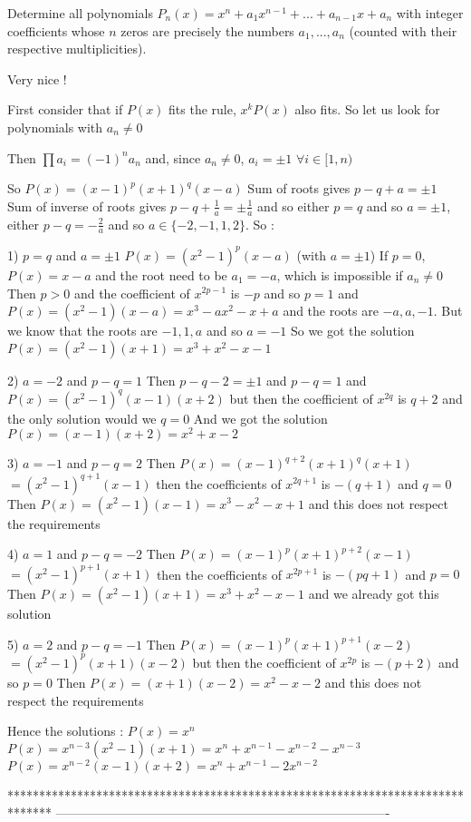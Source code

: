 \begin{solution}
	\begin{tcolorbox}Determine all polynomials $ P_n(x) = x^n + a_1 x^{n - 1} + ... + a_{n - 1} x + a_n$ with integer coefficients whose $ n$ zeros are precisely the numbers $ a_1,...,a_n$ (counted with their respective multiplicities).\end{tcolorbox}

Very nice !

First consider that if $ P(x)$ fits the rule, $ x^kP(x)$ also fits. So let us look for polynomials with $ a_n\neq 0$

Then $ \prod a_i=(-1)^na_n$ and, since $ a_n\neq 0$, $ a_i=\pm 1$ $ \forall i\in[1,n)$

So $ P(x)=(x-1)^p(x+1)^q(x-a)$
Sum of roots gives $ p-q+a=\pm 1$
Sum of inverse of roots gives $ p-q+\frac 1a=\pm\frac 1a$ and so either $ p=q$ and so $ a=\pm 1$, either $ p-q=-\frac 2a$ and so $ a\in\{-2,-1,1,2\}$. So :

1) $ p=q$ and $ a=\pm 1$
$ P(x)=(x^2-1)^p(x-a)$ (with $ a=\pm 1$)
If $ p=0$, $ P(x)=x-a$ and the root need to be $ a_1=-a$, which is impossible if $ a_n\neq 0$
Then $ p>0$ and the coefficient of $ x^{2p-1}$ is $ -p$ and so $ p=1$ and $ P(x)=(x^2-1)(x-a)=x^3-ax^2-x+a$ and the roots are $ -a,a,-1$. But we know that the roots are $ -1,1,a$ and so $ a=-1$
So we got the solution $ P(x)=(x^2-1)(x+1)=x^3+x^2-x-1$

2) $ a=-2$ and $ p-q=1$
Then $ p-q-2=\pm 1$ and $ p-q=1$ and $ P(x)=(x^2-1)^q(x-1)(x+2)$ but then the coefficient of $ x^{2q}$ is $ q+2$ and the only solution would we $ q=0$
And we got the solution $ P(x)=(x-1)(x+2)=x^2+x-2$

3) $ a=-1$ and $ p-q=2$
Then $ P(x)=(x-1)^{q+2}(x+1)^q(x+1)$ $ =(x^2-1)^{q+1}(x-1)$ then the coefficients of $ x^{2q+1}$ is $ -(q+1)$ and $ q=0$
Then $ P(x)=(x^2-1)(x-1)=x^3-x^2-x+1$ and this does not respect the requirements

4) $ a=1$ and $ p-q=-2$
Then $ P(x)=(x-1)^p(x+1)^{p+2}(x-1)$ $ =(x^2-1)^{p+1}(x+1)$ then the coefficients of $ x^{2p+1}$ is $ -(pq+1)$ and $ p=0$
Then $ P(x)=(x^2-1)(x+1)=x^3+x^2-x-1$ and we already got this solution

5) $ a=2$ and $ p-q=-1$
Then $ P(x)=(x-1)^p(x+1)^{p+1}(x-2)$ $ =(x^2-1)^p(x+1)(x-2)$ but then the coefficient of $ x^{2p}$ is $ -(p+2)$ and so $ p=0$
Then $ P(x)=(x+1)(x-2)=x^2-x-2$ and this does not respect the requirements


Hence the solutions :
$ P(x)=x^n$
$ P(x)=x^{n-3}(x^2-1)(x+1)=x^n+x^{n-1}-x^{n-2}-x^{n-3}$
$ P(x)=x^{n-2}(x-1)(x+2)=x^n+x^{n-1}-2x^{n-2}$
\end{solution}
*******************************************************************************
-------------------------------------------------------------------------------


